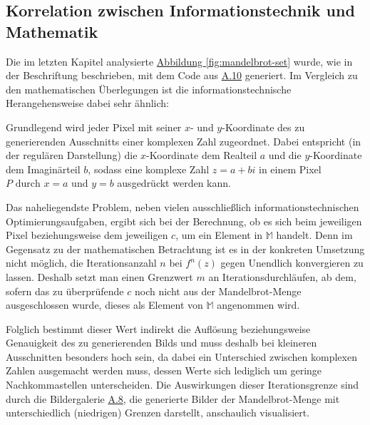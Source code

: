 \subsection{Korrelation zwischen Informationstechnik und Mathematik}
\label{subsec:correlation-between-it-and-mathematics}

Die im letzten Kapitel analysierte \hyperref[fig:mandelbrot-set]
{Abbildung \ref{fig:mandelbrot-set}} wurde,
wie in der Beschriftung beschrieben, mit dem Code aus \hyperref[app:10]{A.10}
generiert.
Im Vergleich zu den mathematischen Überlegungen ist die
informationstechnische Herangehensweise dabei sehr ähnlich:

Grundlegend wird jeder Pixel mit seiner $x$- und $y$-Koordinate des zu generierenden
Ausschnitts einer komplexen Zahl zugeordnet.
Dabei entspricht (in der regulären Darstellung) die $x$-Koordinate dem Realteil
$a$ und die $y$-Koordinate dem Imaginärteil $b$, sodass eine komplexe Zahl
$z = a + bi$ in einem Pixel $P \text{ durch } x = a \text{ und } y = b$ ausgedrückt
werden kann.

Das naheliegendste Problem, neben vielen ausschließlich informationstechnischen
Optimierungsaufgaben, ergibt sich bei der Berechnung, ob es sich beim jeweiligen Pixel
beziehungsweise dem jeweiligen $c$, um ein Element in
$\mathbb{M}$ handelt.
Denn im Gegensatz zu der mathematischen Betrachtung ist es in der konkreten Umsetzung
nicht möglich, die Iterationsanzahl $n$ bei $f^n(z)$ gegen Unendlich konvergieren zu lassen.
Deshalb setzt man einen Grenzwert $m$ an Iterationsdurchläufen, ab dem,
sofern das zu überprüfende $c$ noch nicht aus der Mandelbrot-Menge
ausgeschlossen wurde, dieses als Element von $\mathbb{M}$ angenommen wird.

Folglich bestimmt dieser Wert indirekt die Auflösung beziehungsweise Genauigkeit
des zu generierenden Bilds und muss deshalb bei kleineren Ausschnitten besonders
hoch sein, da dabei ein Unterschied zwischen komplexen Zahlen ausgemacht werden
muss, dessen Werte sich lediglich um geringe Nachkommastellen unterscheiden.
Die Auswirkungen dieser Iterationsgrenze sind durch die Bildergalerie
\hyperref[app:8]{A.8}, die generierte Bilder der Mandelbrot-Menge
mit unterschiedlich (niedrigen) Grenzen darstellt, anschaulich visualisiert.